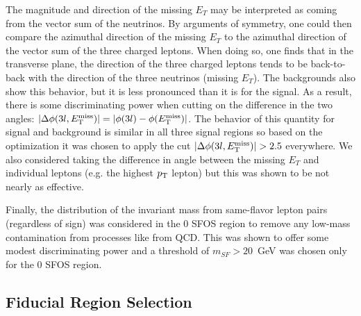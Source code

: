 








The magnitude and direction
of the missing $E_{T}$ may be interpreted as coming from the 
vector sum of the neutrinos.  By arguments of 
symmetry, one could then compare the azimuthal direction 
of the missing $E_{T}$ to the azimuthal direction of the vector
sum of the three charged leptons. When doing so, one finds that 
in the transverse plane, 
the direction of the three charged leptons
tends to be back-to-back with the direction of the 
three neutrinos (missing $E_{T}$). The
backgrounds also show this behavior, but it is less pronounced than 
it is for the signal.  As a result, 
there is some discriminating power when cutting on the difference 
in the two angles: 
$|\Delta\phi(3l,E_{\mathrm{T}}^{\mathrm{miss}})| = |\phi(3l)-\phi(E_{\mathrm{T}}^{\mathrm{miss}})|$. 
The behavior of this quantity for signal and
background is similar in all three signal regions so based on the 
optimization it was chosen to apply the cut
$|\Delta\phi(3l,E_{\mathrm{T}}^{\mathrm{miss}})| > 2.5$ everywhere.  
We also considered taking the difference in angle between
the missing $E_{T}$ and individual leptons (e.g. the highest $p_{\mathrm{T}}$ lepton) 
but this was shown to be not nearly as effective.  

Finally, the distribution of the invariant mass
from same-flavor lepton pairs (regardless of sign) 
was considered in the 0 SFOS 
region to remove any low-mass contamination from processes like from QCD.  
This was shown to offer some
modest discriminating power and a threshold of $m_{SF} > 20$~GeV 
was chosen only for the 0 SFOS region.

\subsection{Fiducial Region Selection}
\label{sec:fiducial}

